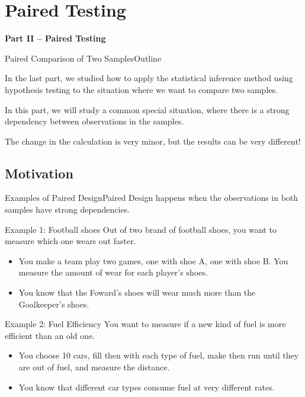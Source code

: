 \section{Paired Testing}
\begin{frame}
  \begin{center}
  {\bf Part II -- Paired Testing}
  \end{center}
\end{frame}

\begin{frame}{Paired Comparison of Two Samples}{Outline}

  In the last part, we studied how to apply the statistical inference method using hypothesis testing to the situation where we want to compare two samples.\bigskip

  In this part, we will study a common special situation, where there is a strong dependency between observations in the samples.\bigskip

  The change in the calculation is very minor, but the results can be very different!
\end{frame}

\subsection{Motivation}
\begin{frame}{Examples of Paired Design}{Paired Design happens when the observations in both samples have strong dependencies.}

  \begin{block}{Example 1: Football shoes}
    Out of two brand of football shoes, you want to measure which one wears out faster.
    \begin{itemize}
      \item You make a team play two games, one with shoe A, one with shoe B. You measure the amount of wear for each player's shoes.
      \item You know that the Foward's shoes will wear much more than the Goalkeeper's shoes.
    \end{itemize}
  \end{block}
  \begin{block}{Example 2: Fuel Efficiency}
    You want to measure if a new kind of fuel is more efficient than an old one.
    \begin{itemize}
      \item You choose 10 cars, fill then with each type of fuel, make then run until they are out of fuel, and measure the distance.
      \item You know that different car types consume fuel at very different rates.
    \end{itemize}
  \end{block}
\end{frame}

